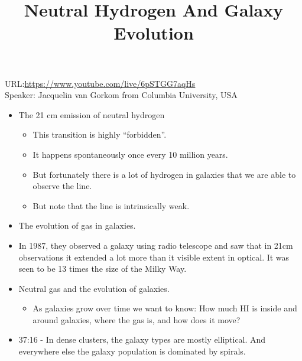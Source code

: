 \documentclass{../template/texnote}
\title{Neutral Hydrogen And Galaxy Evolution}
\begin{document}
    \maketitle {}
URL:\url{https://www.youtube.com/live/6pSTGG7aqHs}\\
Speaker: Jacquelin van Gorkom from Columbia University, USA
\begin{itemize}
	\item The 21 cm emission of neutral hydrogen
	\begin{itemize}
		\item This transition is highly ``forbidden''.
		\item It happens spontaneously once every 10 million years.
		\item But fortunately there is a lot of hydrogen in galaxies that we are able to observe the line.
		\item But note that the line is intrinsically weak.
	\end{itemize}
\item The evolution of gas in galaxies.
\item In 1987, they observed a galaxy using radio telescope and saw that in 21cm observations it extended a lot more than it visible extent in optical.
	It was seen to be 13 times the size of the Milky Way.
\item Neutral gas and the evolution of galaxies.
	\begin{itemize}
		\item As galaxies grow over time we want to know: How much HI is inside and around galaxies, where the gas is, and how does it move?
	\end{itemize}
\item 37:16 - In dense clusters, the galaxy types are mostly elliptical.
	And everywhere else the galaxy population is dominated by spirals.
\end{itemize}
    \printbibliography
\end{document}

